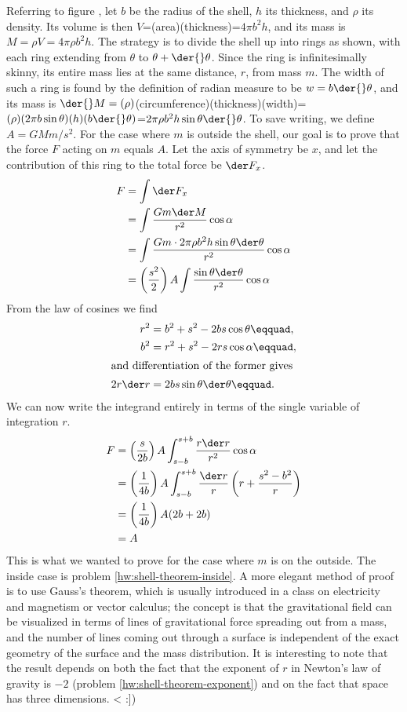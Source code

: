Referring to figure , let $b$ be the radius of the shell, $h$ its thickness, and $\rho$
its density.
Its volume is then $V$=(area)(thickness)=$4\pi{}b^2h$, and
its mass is $M=\rho{}V=4\pi{}\rho{}b^2h$. The strategy is to divide the shell
up into rings as shown, with each ring
extending from $\theta$ to $\theta+\der{}\theta$. Since the ring is infinitesimally
skinny, its entire mass lies at the same distance, $r$, from mass $m$.
The width of such a ring is
found by the definition of radian measure to be $w=b\der{}\theta$, and its mass
is $\der{}M=(\rho)$(circumference)(thickness)(width)=
$(\rho)(2\pi{}b \sin{} \theta)(h)(b\der{}\theta)$=$2\pi\rho b^2h\sin{}\theta\der{}\theta$.
To save writing, we define $A=GMm/s^2$. For the case where $m$ is outside the shell, our goal is to prove that the force $F$ acting on
$m$ equals $A$. Let the axis of symmetry be $x$, and let the contribution of this ring to the total force be $\der F_x$.
\begin{align*}
  F &= \int \der F_x \\
    &= \int \frac{Gm \der M }{r^2}\cos\alpha \\
    &= \int \frac{Gm \cdot 2\pi\rho b^2h\sin\theta\der\theta}{r^2}\cos\alpha \\
    &= \left(\frac{s^2}{2}\right)A\int \frac{\sin\theta\der\theta}{r^2}\cos\alpha 
\end{align*}
From the law of cosines we find
\begin{align*}
  r^2 &= b^2 + s^2 - 2bs\cos\theta\eqquad,\\
  b^2 &= r^2 + s^2 -2rs\cos\alpha\eqquad,\\
\intertext{and differentiation of the former gives}  
  2r\der r & =        2bs\sin\theta\der\theta\eqquad.
\end{align*}
We can now write the integrand entirely in terms of the single variable of integration $r$.
\begin{align*}
  F &= \left(\frac{s}{2b}\right)A \int_{s-b}^{s+b} \frac{r\der r}{r^2}\cos\alpha \\
    &= \left(\frac{1}{4b}\right)A \int_{s-b}^{s+b} \frac{\der r}{r}\left(r+\frac{s^2-b^2}{r}\right) \\
    &= \left(\frac{1}{4b}\right)A (2b+2b) \\
    &= A
\end{align*}
This is what we wanted to prove for the case where $m$ is on the outside. The inside case is problem
\ref{hw:shell-theorem-inside}. A more elegant method of proof is to use Gauss's theorem, which is usually
introduced in a class on electricity and magnetism or vector calculus; the concept is that the gravitational
field can be visualized in terms of lines of gravitational force spreading out from a mass, and the number
of lines coming out through a surface is independent of the exact geometry of the surface and the mass
distribution.
It is interesting to note that the result depends on both the fact that
the exponent of $r$ in Newton's law of gravity is $-2$ (problem \ref{hw:shell-theorem-exponent}) and on the fact that space has three dimensions.
<%
:])

